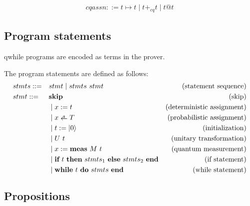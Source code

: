 \begin{definition}
    \begin{align*}
        cqassn ::= t\mapsto t \mid t +_{cq} t \mid t @ t
    \end{align*}
\end{definition}

\subsection{Program statements}
qwhile programs are encoded as terms in the prover.

\newcommand{\rndarrow}{%
  \stackrel{\raisebox{-.25ex}[.25ex]%
   {\tiny $\mathdollar$}}{\raisebox{-.25ex}[.25ex]{$\leftarrow$}}}

\newcommand{\Skip}{\textbf{skip}}
\newcommand{\Assign}[2]{\ensuremath{#1:=#2}}
\newcommand{\pAssign}[2]{\ensuremath{#1 \rndarrow #2}}
\newcommand{\Init}[1]{\ensuremath{#1:=\ket{0}}}
\newcommand{\MeaAssign}[3]{\ensuremath{#1 := \textbf{meas}\ #2\ #3}}
\newcommand{\If}[3]{\ensuremath{
    \textbf{if}\ #1\ \textbf{then}\ #2\ \textbf{else}\ #3\ \textbf{end}
}}
\newcommand{\While}[2]{\ensuremath{
    \textbf{while}\ #1\ \textbf{do}\ #2\ \textbf{end}
}}

\begin{definition}
    \label{def: prog syntax}
    The program statements are defined as follows:
    \begin{align*}
        & stmts ::= && stmt \mid stmts\ stmt & \text{(statement sequence)} \\
        & stmt ::= && \Skip & \text{(skip)} \\
            & && \mid \Assign{x}{t} & \text{(deterministic assignment)} \\
            & && \mid \pAssign{x}{T} & \text{(probabilistic assignment)} \\
            & && \mid \Init{t} & \text{(initialization)} \\
            & && \mid U\ t & \text{(unitary transformation)} \\
            & && \mid \MeaAssign{x}{M}{t} & \text{(quantum measurement)} \\
            & && \mid \If{t}{stmts_1}{stmts_2} & \text{(if statement)} \\
            & && \mid \While{t}{stmts} & \text{(while statement)}
    \end{align*}
\end{definition}

\subsection{Propositions}

